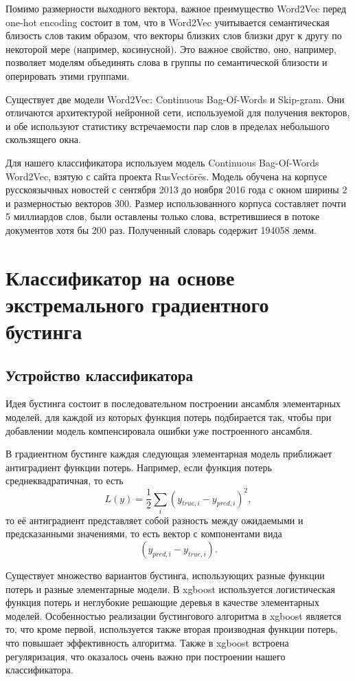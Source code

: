 \documentclass[14pt,russian]{extreport}
\begin{document}
Помимо размерности выходного вектора, важное преимущество Word2Vec перед
one-hot encoding состоит в том, что в Word2Vec учитывается семантическая
близость слов таким образом, что векторы близких слов близки друг к другу по
некоторой мере (например, косинусной)\cite{from_freq}. Это важное свойство,
оно, например, позволяет моделям объединять слова в группы по семантической
близости и оперировать этими группами.

Существует две модели Word2Vec: Continuous Bag-Of-Words и Skip-gram. Они
отличаются архитектурой нейронной сети, используемой для получения векторов, и
обе используют статистику встречаемости пар слов в пределах небольшого
скользящего окна.

Для нашего классификатора используем модель Continuous Bag-Of-Words Word2Vec,
взятую с сайта проекта RusVect\={o}r\={e}s\cite{KutuzovKuzmenko2017}. Модель обучена на корпусе русскоязычных
новостей с сентября 2013 до ноября 2016 года с окном ширины 2 и размерностью
векторов 300. Размер использованного корпуса составляет почти 5 миллиардов
слов, были оставлены только слова, встретившиеся в потоке документов хотя бы
200 раз. Полученный словарь содержит 194058 лемм.

\section{Классификатор на основе экстремального градиентного бустинга}

\subsection{Устройство классификатора}

Идея бустинга состоит в последовательном построении ансамбля элементарных
моделей, для каждой из которых функция потерь подбирается так, чтобы при
добавлении модель компенсировала ошибки уже построенного ансамбля.

В градиентном бустинге каждая следующая элементарная модель приближает
антиградиент функции потерь. Например, если функция потерь среднеквадратичная,
то есть $$ L(y) = \frac12 \sum_i (y_{true,i} - y_{pred,i})^2, $$ то её
антиградиент представляет собой разность между ожидаемыми и предсказанными
значениями, то есть вектор с компонентами вида $$(y_{pred,i} - y_{true,i}).$$

Существует множество вариантов бустинга, использующих разные функции потерь и
разные элементарные модели. В xgboost\cite{chen2016xgboost} используется
логистическая функция потерь и неглубокие решающие деревья в качестве
элементарных моделей. Особенностью реализации бустингового алгоритма в xgboost
является то, что кроме первой, используется также вторая производная функции
потерь, что повышает эффективность алгоритма. Также в xgboost встроена
регуляризация, что оказалось очень важно при построении нашего классификатора.
\end{document}
